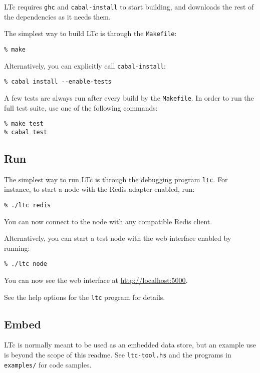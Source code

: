 \documentclass[11pt, a4paper, titlepage]{article}
\begin{document}
LTc requires \texttt{ghc} and \texttt{cabal-install} to start
building, and downloads the rest of the dependencies as it needs them.

The simplest way to build LTc is through the \texttt{Makefile}:

\begin{verbatim}
% make
\end{verbatim}

Alternatively, you can explicitly call \texttt{cabal-install}:

\begin{verbatim}
% cabal install --enable-tests
\end{verbatim}

A few tests are always run after every build by the \texttt{Makefile}.
In order to run the full test suite, use one of the following commands:

\begin{verbatim}
% make test
% cabal test
\end{verbatim}

\subsection{Run}

The simplest way to run LTc is through the debugging program
\texttt{ltc}. For instance, to start a node with the Redis adapter
enabled, run:

\begin{verbatim}
% ./ltc redis
\end{verbatim}

You can now connect to the node with any compatible Redis client.

Alternatively, you can start a test node with the web interface enabled
by running:

\begin{verbatim}
% ./ltc node
\end{verbatim}

You can now see the web interface at \url{http://localhost:5000}.

See the help options for the \texttt{ltc} program for details.

\subsection{Embed}

LTc is normally meant to be used as an embedded data store, but an
example use is beyond the scope of this readme. See \texttt{ltc-tool.hs}
and the programs in \texttt{examples/} for code samples.
\end{document}

